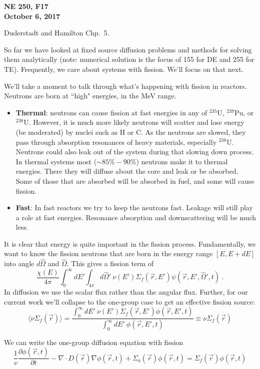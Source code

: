 \documentclass[12pt]{article}
\newcommand{\vOmega}{\ensuremath{\hat{\Omega}}}
\begin{document}
\begin{center}
{\bf NE 250, F17\\
October 6, 2017 
}
\end{center}

Duderstadt and Hamilton Chp.\ 5.

So far we have looked at fixed source diffusion problems and methods for solving them analytically (note: numerical solution is the focus of 155 for DE and 255 for TE). Frequently, we care about systems with fission. We'll focus on that next.

We'll take a moment to talk through what's happening with fission in reactors. Neutrons are born at ``high" energies, in the MeV range. 
\begin{itemize}
\item \textbf{Thermal}: neutrons can cause fission at fast energies in any of $^{235}$U, $^{239}$Pu, or $^{238}$U. However, it is much more likely neutrons will scatter and lose energy (be moderated) by nuclei such as H or C. As the neutrons are slowed, they pass through absorption resonances of heavy  materials, especially $^{238}$U. Neutrons could also leak out of the system during that slowing down process. In thermal systems most ($\sim 85\%-90\%$) neutrons make it to thermal energies. There they will diffuse about the core and leak or be absorbed. Some of those that are absorbed will be absorbed in fuel, and some will cause fission.

\item \textbf{Fast}: In fast reactors we try to keep the neutrons fast. Leakage will still play a role at fast energies. Resonance absorption and downscattering will be much less. 
\end{itemize}
%
It is clear that energy is quite important in the fission process. Fundamentally, we want to know the fission neutrons that are born in the energy range $[E, E+dE]$ into angle $d\vOmega$ and $\vOmega$. This gives a fission term of 
\[
\frac{\chi(E)}{4\pi} \int_0^{\infty} dE' \int_{4\pi} d\vOmega' \: \nu(E') \Sigma_f(\vec{r}, E') \psi(\vec{r}, E', \vOmega', t) \:.  
\] 
In diffusion we use the scalar flux rather than the angular flux. Further, for our current work we'll collapse to the one-group case to get an effective fission source:
\[
\langle \nu \Sigma_f (\vec{r}) \rangle = \frac{\int_0^{\infty} dE'\: \nu(E') \Sigma_f(\vec{r}, E') \phi(\vec{r}, E', t)} {\int_0^{\infty} dE'\: \phi(\vec{r}, E', t)} \equiv \nu \Sigma_f (\vec{r}) 
\]

We can write the one-group diffusion equation with fission
\begin{equation}
\frac{1}{v} \frac{\partial \phi(\vec{r}, t)}{\partial t} - \nabla \cdot D(\vec{r}) \nabla	\phi(\vec{r}, t) + \Sigma_a(\vec{r}) \phi(\vec{r}, t) = \Sigma_f (\vec{r})\phi(\vec{r}, t)
\end{equation}
\end{document}

